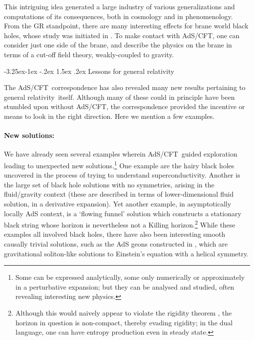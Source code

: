 \documentclass[12pt]{article}
\makeatletter
\renewcommand\subsection{\@startsection{subsection}{2}{\z@}%
                                     {-3.25ex\@plus -1ex \@minus -.2ex}%
                                     {1.5ex \@plus .2ex}%
                                     {\normalfont\bfseries}}
\def\AC{AdS/CFT}
\def\GR{general relativity}
\makeatother
\begin{document}
This intriguing idea generated a large industry of various generalizations  and computations of its consequences, both in cosmology and in phenomenology.  
From the GR standpoint, there are many interesting effects for brane world black holes, whose study was initiated in \cite{Emparan:1999wa}.  To make contact with \AC, one can consider just one side of the brane, and describe the physics on the brane in terms of a cut-off field theory,  weakly-coupled to gravity.

\subsection{Lessons for \GR}
\label{s:lessonsGR}

The \AC\ correspondence has also revealed many new results pertaining to \GR\ itself.  
Although many of these could in principle have been stumbled upon without \AC, the correspondence provided the incentive or means to look in the right direction.  Here we mention a few examples.

\paragraph{New solutions:}  %
We have already seen several examples wherein \AC\ guided exploration 
 leading to unexpected new solutions.\footnote{
Some can be expressed analytically, some only numerically or approximately in a perturbative expansion; but they can be analysed and studied, often revealing interesting new physics.
}    One example are the hairy black holes uncovered in the process of trying to understand superconductivity.  
Another is the large set of black hole solutions with no symmetries, arising in the fluid/gravity context (these are described in terms of lower-dimensional fluid solution, in a derivative expansion).  
Yet another example, in asymptotically locally AdS context,
  is a `flowing funnel' solution \cite{Fischetti:2012vt,Figueras:2012rb} which constructs a stationary black string whose horizon is nevertheless not a Killing horizon.\footnote{
  Although this would naively appear to violate the rigidity theorem \cite{Hollands:2006rj}, the horizon in question is non-compact, thereby evading rigidity; in the dual language, one can have entropy production even in steady state.}
While these examples all involved black holes, there have also been interesting smooth causally trivial solutions, such as the AdS  geons constructed in \cite{Dias:2011at}, which are gravitational soliton-like solutions to Einstein's equation with a helical symmetry. 
\end{document}
